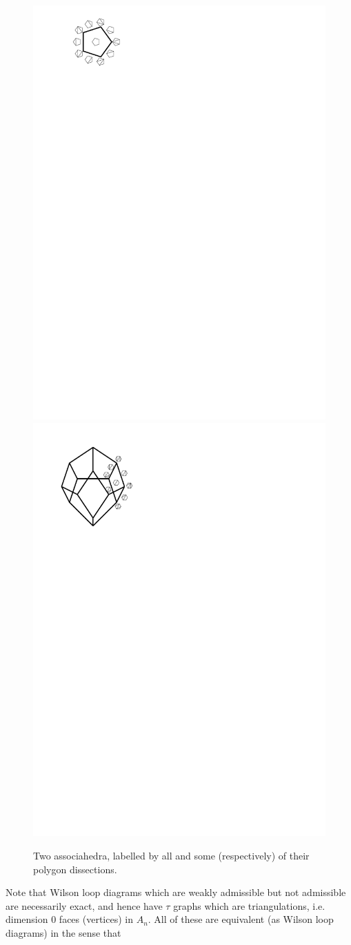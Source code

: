 \documentclass[11pt]{article}
\theoremstyle{remark}
\theoremstyle{definition}
\begin{document}
\begin{figure}
\includegraphics{associahedron5gon} \hspace{1cm} \includegraphics{associahedron3d}
\caption{Two associahedra, labelled by all and some (respectively) of their polygon dissections.}\label{associahedron5gon}
\end{figure}

Note that Wilson loop diagrams which are weakly admissible but not admissible are necessarily exact, and hence have $\tau$ graphs which are triangulations, i.e. dimension 0 faces (vertices) in $A_n$.  All of these are equivalent (as Wilson loop diagrams) in the sense that
\end{document}

